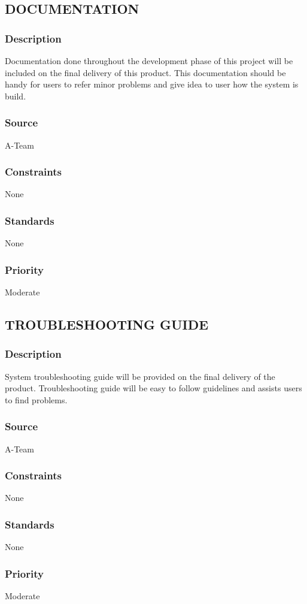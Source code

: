 \subsection{DOCUMENTATION}
\subsubsection{Description}
Documentation done throughout the development phase of this project will be included on the final delivery of this product. This documentation should be handy for users to refer minor problems and give idea to user how the system is build. 
\subsubsection{Source}
A-Team 
\subsubsection{Constraints}
None
\subsubsection{Standards}
None
\subsubsection{Priority}
Moderate

\subsection{TROUBLESHOOTING GUIDE}
\subsubsection{Description}
System troubleshooting guide will be provided on the final delivery of the product. Troubleshooting guide will be easy to follow guidelines and assists users to find problems. 
\subsubsection{Source}
A-Team 
\subsubsection{Constraints}
None
\subsubsection{Standards}
None
\subsubsection{Priority}
Moderate


